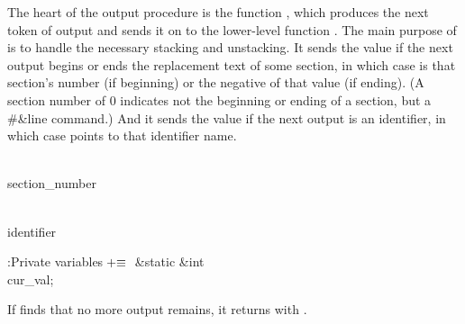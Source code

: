 The heart of the output procedure is the function ,
which produces the next token of output and sends it on to the lower-level
function . The main purpose of  is to
handle the
necessary stacking and unstacking. It sends the value 
if the next output begins or ends the replacement text of some section,
in which case  is that section's number (if beginning) or the
negative of that value (if ending). (A section number of 0 indicates
not the beginning or ending of a section, but a \#\&{line} command.)
And it sends the value 
if the next output is an identifier, in which case
 points to that identifier name.

\Y\B\4\D\\{section\_number}\5
\par
\B\4\D\\{identifier}\5
\par
\Y\B\4:Private variables\X${}\mathrel+\equiv{}$\6
\&{static} \&{int} \\{cur\_val};\par
\fi

If  finds that no more output remains, it returns
with
.

